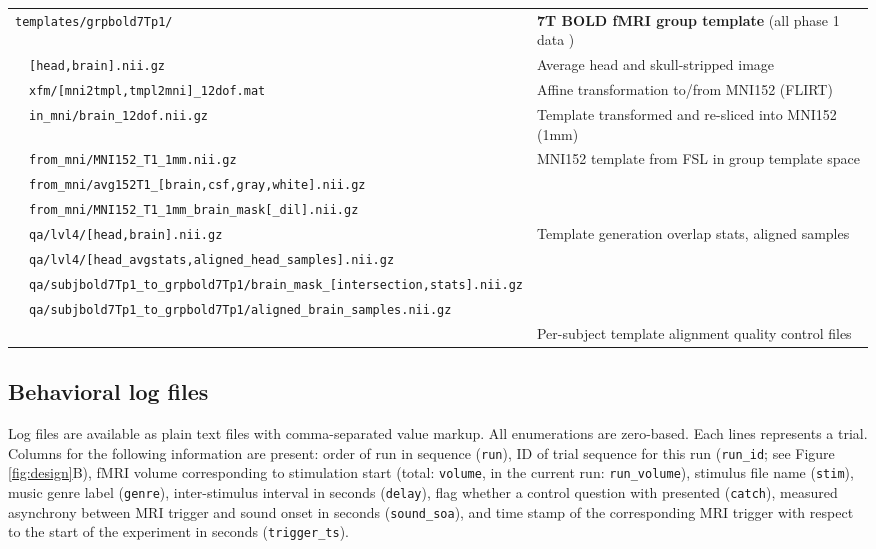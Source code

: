 \begin{table*}[p]
\begin{tabular}{p{2mm}p{65mm}p{95mm}}
    \midrule
    \multicolumn{2}{l}{\texttt{templates/grpbold7Tp1/}} & \textbf{7T BOLD fMRI group template} (all phase 1 data )\\
    &   \texttt{[head,brain].nii.gz} & Average head and skull-stripped image\\
    &   \texttt{xfm/[mni2tmpl,tmpl2mni]\_12dof.mat} & Affine transformation to/from MNI152 (FLIRT)\\
    &   \texttt{in\_mni/brain\_12dof.nii.gz} & Template transformed and re-sliced into MNI152 (1mm)\\
    &   \texttt{from\_mni/MNI152\_T1\_1mm.nii.gz} & MNI152 template from FSL in group template space \\
    &   \texttt{from\_mni/avg152T1\_[brain,csf,gray,white].nii.gz} \\
    &   \texttt{from\_mni/MNI152\_T1\_1mm\_brain\_mask[\_dil].nii.gz} \\
    &   \texttt{qa/lvl4/[head,brain].nii.gz} & Template generation overlap stats, aligned samples \\
    &   \texttt{qa/lvl4/[head\_avgstats,aligned\_head\_samples].nii.gz} \\
    &   \texttt{qa/subjbold7Tp1\_to\_grpbold7Tp1/brain\_mask\_[intersection,stats].nii.gz} \\
    &   \texttt{qa/subjbold7Tp1\_to\_grpbold7Tp1/aligned\_brain\_samples.nii.gz} \\
    & & Per-subject template alignment quality control files \\
    \bottomrule
  \end{tabular}
  \label{tab:dslayout}
\end{table*}

%

\subsection*{Behavioral log files}

Log files are available as plain text files with comma-separated value markup.
All enumerations are zero-based. Each lines represents a trial. Columns for the
following information are present: order of run in sequence (\texttt{run}), ID
of trial sequence for this run (\texttt{run\_id}; see Figure
\ref{fig:design}B), fMRI volume corresponding to stimulation start (total:
\texttt{volume}, in the current run: \texttt{run\_volume}), stimulus file name
(\texttt{stim}), music genre label (\texttt{genre}), inter-stimulus interval in
seconds (\texttt{delay}), flag whether a control question with presented
(\texttt{catch}), measured asynchrony between MRI trigger and sound onset in
seconds (\texttt{sound\_soa}), and time stamp of the corresponding MRI trigger
with respect to the start of the experiment in seconds (\texttt{trigger\_ts}).

